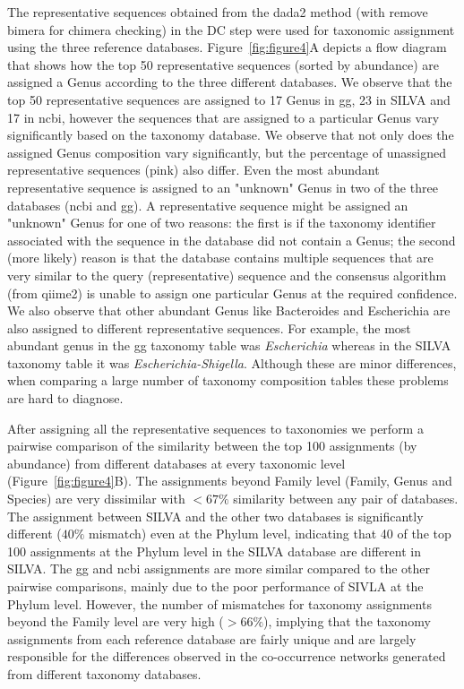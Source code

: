   The representative sequences obtained from the \ac{dada2} method (with remove bimera for chimera checking) in the DC step were used for taxonomic assignment using the three reference databases.
  Figure~\ref{fig:figure4}A depicts a flow diagram that shows how the top 50 representative sequences (sorted by abundance) are assigned a Genus according to the three different databases.
  We observe that the top 50 representative sequences are assigned to 17 Genus in \ac{gg}, 23 in SILVA and 17 in \ac{ncbi}, however the sequences that are assigned to a particular Genus vary significantly based on the taxonomy database.
  We observe that not only does the assigned Genus composition vary significantly, but the percentage of unassigned representative sequences (pink) also differ.
  Even the most abundant representative sequence is assigned to an "unknown" Genus in two of the three databases (\ac{ncbi} and \ac{gg}).
  A representative sequence might be assigned an "unknown" Genus for one of two reasons: the first is if the taxonomy identifier associated with the sequence in the database did not contain a Genus; the second (more likely) reason is that the database contains multiple sequences that are very similar to the query (representative) sequence and the consensus algorithm (from \ac{qiime2}) is unable to assign one particular Genus at the required confidence.
  We also observe that other abundant Genus like Bacteroides and Escherichia are also assigned to different representative sequences.
  For example, the most abundant genus in the \ac{gg} taxonomy table was \textit{Escherichia} whereas in the SILVA taxonomy table it was \textit{Escherichia-Shigella}.
  Although these are minor differences, when comparing a large number of taxonomy composition tables these problems are hard to diagnose.

  After assigning all the representative sequences to taxonomies we perform a pairwise comparison of the similarity between the top 100 assignments (by abundance) from different databases at every taxonomic level (Figure~\ref{fig:figure4}B).
  The assignments beyond Family level (Family, Genus and Species) are very dissimilar with $<67\%$ similarity between any pair of databases.
  The assignment between SILVA and the other two databases is significantly different ($40\%$ mismatch) even at the Phylum level, indicating that 40 of the top 100 assignments at the Phylum level in the SILVA database are different in SILVA.
  The \ac{gg} and \ac{ncbi} assignments are more similar compared to the other pairwise comparisons, mainly due to the poor performance of SIVLA at the Phylum level.
  However, the number of mismatches for taxonomy assignments beyond the Family level are very high ($>66\%$), implying that the taxonomy assignments from each reference database are fairly unique and are largely responsible for the differences observed in the co-occurrence networks generated from different taxonomy databases.

